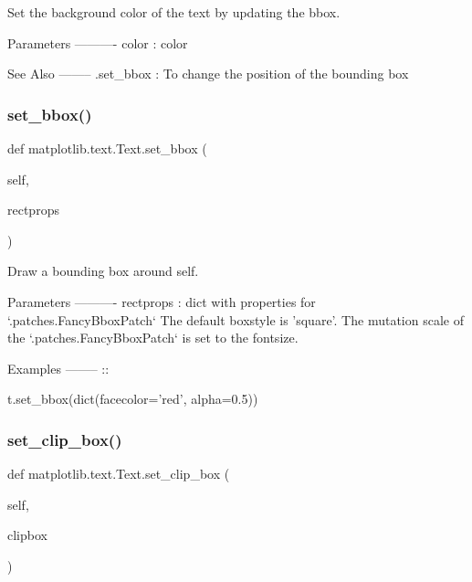 \begin{DoxyVerb}Set the background color of the text by updating the bbox.

Parameters
----------
color : color

See Also
--------
.set_bbox : To change the position of the bounding box
\end{DoxyVerb}
 \mbox{\label{classmatplotlib_1_1text_1_1Text_ab36ae76ec16c78de0e3df01d00dfc61d}} 
\subsubsection{\texorpdfstring{set\+\_\+bbox()}{set\_bbox()}}
{\footnotesize\ttfamily def matplotlib.\+text.\+Text.\+set\+\_\+bbox (\begin{DoxyParamCaption}\item[{}]{self,  }\item[{}]{rectprops }\end{DoxyParamCaption})}

\begin{DoxyVerb}Draw a bounding box around self.

Parameters
----------
rectprops : dict with properties for `.patches.FancyBboxPatch`
     The default boxstyle is 'square'. The mutation
     scale of the `.patches.FancyBboxPatch` is set to the fontsize.

Examples
--------
::

    t.set_bbox(dict(facecolor='red', alpha=0.5))
\end{DoxyVerb}
 \mbox{\label{classmatplotlib_1_1text_1_1Text_ad464adc595692ff1c184d74cd6a182c6}} 
\subsubsection{\texorpdfstring{set\+\_\+clip\+\_\+box()}{set\_clip\_box()}}
{\footnotesize\ttfamily def matplotlib.\+text.\+Text.\+set\+\_\+clip\+\_\+box (\begin{DoxyParamCaption}\item[{}]{self,  }\item[{}]{clipbox }\end{DoxyParamCaption})}

